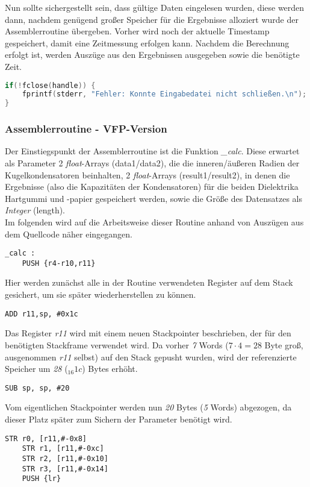 \documentclass[11pt]{scrartcl}
\begin{document}
Nun sollte sichergestellt sein, dass gültige Daten eingelesen wurden, diese werden dann, nachdem genügend großer Speicher für die Ergebnisse alloziert wurde der Assemblerroutine übergeben. Vorher wird noch der aktuelle Timestamp gespeichert, damit eine Zeitmessung erfolgen kann. Nachdem die Berechnung erfolgt ist, werden Auszüge aus den Ergebnissen ausgegeben sowie die benötigte Zeit.

\begin{lstlisting}[language=C]
if(!fclose(handle)) {
	fprintf(stderr, "Fehler: Konnte Eingabedatei nicht schließen.\n");
}
\end{lstlisting}

\subsubsection{Assemblerroutine - VFP-Version}
Der Einstiegspunkt der Assemblerroutine ist die Funktion \emph{\_calc}. Diese erwartet als Parameter 2 \emph{float}-Arrays (data1/data2), die die inneren/äußeren Radien der Kugelkondensatoren beinhalten, 2 \emph{float}-Arrays (result1/result2), in denen die Ergebnisse (also die Kapazitäten der Kondensatoren) für die beiden Dielektrika Hartgummi und -papier gespeichert werden, sowie die Größe des Datensatzes als \emph{Integer} (length).\\
Im folgenden wird auf die Arbeitsweise dieser Routine anhand von Auszügen aus dem Quellcode näher eingegangen.
\begin{lstlisting}[language={[x86masm]Assembler}]
_calc :
	PUSH {r4-r10,r11}
\end{lstlisting}
Hier werden zunächst alle in der Routine verwendeten Register auf dem Stack gesichert, um sie später wiederherstellen zu können.
\begin{lstlisting}[language={[x86masm]Assembler}]
	ADD r11,sp, #0x1c
\end{lstlisting}
Das Register \emph{r11} wird mit einem neuen Stackpointer beschrieben, der für den benötigten Stackframe verwendet wird. Da vorher \emph{7} Words ($7 \cdot 4 = 28$ Byte groß, ausgenommen \emph{r11} selbst) auf den Stack gepusht wurden, wird der referenzierte Speicher um \emph{28} ($_{16}1c$) Bytes erhöht. 
\begin{lstlisting}[language={[x86masm]Assembler}]
	SUB sp, sp, #20
\end{lstlisting}
Vom eigentlichen Stackpointer werden nun \emph{20} Bytes (\emph{5} Words) abgezogen, da dieser Platz später zum Sichern der Parameter benötigt wird.
\begin{lstlisting}[language={[x86masm]Assembler}]
	STR r0, [r11,#-0x8]
	STR r1, [r11,#-0xc]
	STR r2, [r11,#-0x10]
	STR r3, [r11,#-0x14]
	PUSH {lr}
\end{lstlisting}
\end{document}
